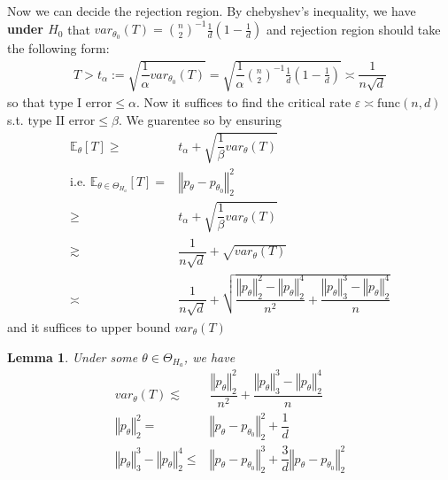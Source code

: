 \documentclass[twoside,12pt]{article}
\newtheorem{lemma}[theorem]{Lemma}
\begin{document}
Now we can decide the rejection region. By chebyshev's inequality, we have \textbf{under $ H_0 $} that $ var_{\theta _0}(T)=\binom{n}{2}^{-1}\frac{1}{d}(1-\frac{1}{d}) $ and rejection region should take the following form:
\begin{align*}
   T > t_\alpha := \sqrt{\dfrac{ 1 }{ \alpha  }var_{\theta _0}(T) }= \sqrt{\dfrac{ 1 }{ \alpha  }\binom{n}{2}^{-1}\frac{1}{d}(1-\frac{1}{d})  } \asymp \dfrac{ 1 }{ n\sqrt{d} } 
\end{align*}
so that $ \text{type I error} \leq \alpha  $. Now it suffices to find the critical rate $ \varepsilon \asymp \text{func}(n,d) $ s.t. $ \text{type II error} \leq \beta  $. We guarentee so by ensuring 
\begin{align*}
   \mathbb{E}_{\theta }\left[ T \right] \geq& t_\alpha + \sqrt{\dfrac{ 1 }{ \beta  }var_{\theta }(T) } \\
    \text{i.e. }    \mathbb{E}_{ \theta \in \Theta _{H_a}}\left[ T \right]  =& \left\Vert p_\theta -p_{\theta _0} \right\Vert _2^2\\
    \geq& t_\alpha + \sqrt{\dfrac{ 1 }{ \beta  }var_{\theta }(T) }\\
    \gtrsim & \dfrac{ 1 }{ n\sqrt{d} } + \sqrt{var_{\theta }(T)}\\
    \asymp &\dfrac{ 1 }{ n\sqrt{d} } + \sqrt{\dfrac{ \left\Vert p_\theta  \right\Vert _2^2 -\left\Vert p_\theta  \right\Vert _2^4 }{ n^2 } + \dfrac{ \left\Vert p_\theta  \right\Vert _3^3 - \left\Vert p_\theta  \right\Vert _2^4 }{ n }}
\end{align*}
and it suffices to upper bound $ var_{\theta }(T)  $






\begin{lemma}
   Under some $ \theta \in \Theta _{H_a} $, we have
   \begin{align*}
      var_\theta (T)\lesssim & \dfrac{ \left\Vert p_\theta  \right\Vert _2^2  }{ n^2 } + \dfrac{ \left\Vert p_\theta  \right\Vert _3^3 - \left\Vert p_\theta  \right\Vert _2^4 }{ n }\tag{1}\\
      \left\Vert p_\theta  \right\Vert _2^2 =& \left\Vert p_\theta -p_{\theta _0} \right\Vert _2^2 +\dfrac{ 1 }{ d } \tag{2}\\
      \left\Vert p_\theta  \right\Vert _3^3 - \left\Vert p_\theta \right\Vert _2^4 \leq& \left\Vert p_\theta -p_{\theta _0} \right\Vert _2^3 + \dfrac{ 3 }{ d }\left\Vert p_\theta -p_{\theta _0} \right\Vert _2^2   \tag{3}
   \end{align*}
\end{lemma}
\end{document}
